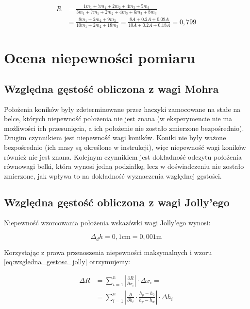 \documentclass[a4paper,12pt]{article}
\begin{document}
\begin{align*}
    R & = \frac{1 m_1 + 7 m_1 + 2 m_2 + 4 m_3 + 5 m_3}{3 m_1 + 7 m_1 + 2 m_2 + 4 m_3 + 6 m_3 + 8 m_3}                            \\
      & = \frac{8 m_1 + 2 m_2 + 9 m_3}{10 m_1 + 2 m_2 + 18 m_3}  = \frac{8 A + 0.2 A + 0.09 A}{10 A + 0.2 A + 0.18 A}  = 0{,}799
\end{align*}



\section{Ocena niepewności pomiaru}



\subsection{Względna gęstość obliczona z wagi Mohra}

Położenia koników były zdeterminowane przez haczyki zamocowane na stałe na belce, których niepewność położenia nie jest znana (w eksperymencie nie ma możliwości ich przesunięcia, a ich położenie nie zostało zmierzone bezpośrednio). Drugim czynnikiem jest niepewność wagi koników. Koniki nie były ważone bezpośrednio (ich masy są określone w instrukcji), więc niepewność wagi koników również nie jest znana. Kolejnym czynnikiem jest dokładność odczytu położenia równowagi belki, która wynosi jedną podziałkę, lecz w doświadczeniu nie zostało zmierzone, jak wpływa to na dokładność wyznaczenia względnej gęstości.

\subsection{Względna gęstość obliczona z wagi Jolly'ego}

Niepewność wzorcowania położenia wskazówki wagi Jolly'ego wynosi:

\begin{equation*}
    \Delta_d h = 0{,}1 \text{cm} = 0{,}001 \text{m}
\end{equation*}

Korzystając z prawa przenoszenia niepewności maksymalnych i wzoru \ref{eq:wzgledna_gestosc_jolly} otrzymujemy:

\begin{align*}
    \Delta R & = \sum_{i=1}^{n} \left | \frac{\partial R}{\partial x_i} \right | \cdot \Delta x_i =                               \\
             & = \sum_{i=1}^{n} \left | \frac{\partial}{\partial h_i} \cdot \frac{h_p - h_0}{h_p - h_w} \right | \cdot \Delta h_i
\end{align*}
\end{document}
